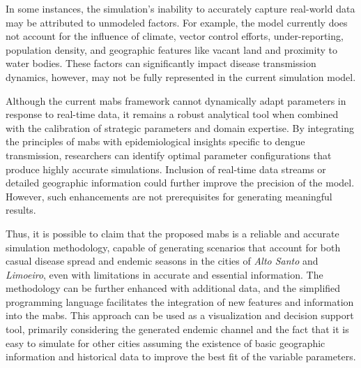 In some instances, the simulation's inability to accurately capture real-world
data may be attributed to unmodeled factors. For example, the model currently
does not account for the influence of climate, vector control efforts,
under-reporting, population density, and geographic features like vacant land
and proximity to water bodies. These factors can significantly impact disease
transmission dynamics, however, may not be fully represented in the current
simulation model.

Although the current \gls{mabs} framework cannot dynamically adapt parameters in
response to real-time data, it remains a robust analytical tool when combined
with the calibration of strategic parameters and domain expertise. By
integrating the principles of \gls{mabs} with epidemiological insights specific
to dengue transmission, researchers can identify optimal parameter
configurations that produce highly accurate simulations. Inclusion of real-time
data streams or detailed geographic information could further improve the
precision of the model. However, such enhancements are not prerequisites for
generating meaningful results.

Thus, it is possible to claim that the proposed \gls{mabs} is a reliable and
accurate simulation methodology, capable of generating scenarios that account
for both casual disease spread and endemic seasons in the cities of \textit{Alto
	Santo} and \textit{Limoeiro}, even with limitations in accurate and essential
information. The methodology can be further enhanced with additional data, and
the simplified programming language facilitates the integration of new features
and information into the \gls{mabs}. This approach can be used as a
visualization and decision support tool, primarily considering the generated
endemic channel and the fact that it is easy to simulate for other cities
assuming the existence of basic geographic information and historical data to
improve the best fit of the variable parameters.


